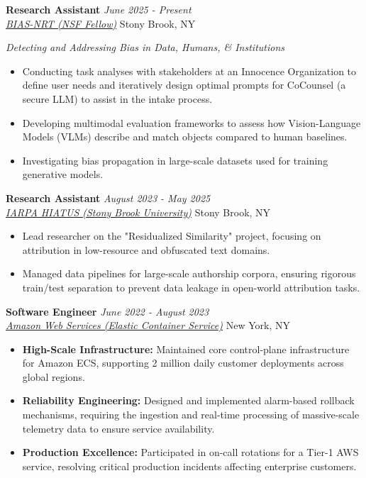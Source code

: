 \documentclass[letterpaper,10pt]{article}
\newcommand{\organization}[4]{
    \vspace{-1.0pt}
    \textbf{#1} \hfill{\emph{#2}} \\
    \emph{#3} \hfill{#4} \\
    \vspace{1.5pt} %
}
\newcommand{\bulletsBegin}{
    \vspace{1pt}
    \begin{minipage}{17.6cm} 
    \begin{itemize}[leftmargin=0.6cm]
    \setlength\itemsep{1pt} %
}
\newcommand{\bulletsEnd}{
    \end{itemize}\vspace{1pt}
    \end{minipage}
}
\begin{document}
    \organization{Research Assistant}{June 2025 - Present}
        {\href{https://www.stonybrook.edu/commcms/bias-nrt/}{BIAS-NRT (NSF Fellow)}}{Stony Brook, NY}
        \emph{Detecting and Addressing Bias in Data, Humans, \& Institutions}
        \bulletsBegin
            \item Conducting task analyses with stakeholders at an Innocence Organization to define user needs and iteratively design optimal prompts for CoCounsel (a secure LLM) to assist in the intake process.
            \item Developing multimodal evaluation frameworks to assess how Vision-Language Models (VLMs) describe and match objects compared to human baselines.
            \item Investigating bias propagation in large-scale datasets used for training generative models.
        \bulletsEnd

    \organization{Research Assistant}{August 2023 - May 2025}
        {\href{https://www.iarpa.gov/research-programs/hiatus}{IARPA HIATUS (Stony Brook University)}}{Stony Brook, NY}
        \bulletsBegin
            \item Lead researcher on the "Residualized Similarity" project, focusing on attribution in low-resource and obfuscated text domains.
            \item Managed data pipelines for large-scale authorship corpora, ensuring rigorous train/test separation to prevent data leakage in open-world attribution tasks.
        \bulletsEnd
        
    \organization{Software Engineer}{June 2022 - August 2023}
        {\href{https://aws.amazon.com/ecs/}{Amazon Web Services (Elastic Container Service)}}{New York, NY}
        \bulletsBegin
            \item \textbf{High-Scale Infrastructure:} Maintained core control-plane infrastructure for Amazon ECS, supporting 2 million daily customer deployments across global regions.
            \item \textbf{Reliability Engineering:} Designed and implemented alarm-based rollback mechanisms, requiring the ingestion and real-time processing of massive-scale telemetry data to ensure service availability.
            \item \textbf{Production Excellence:} Participated in on-call rotations for a Tier-1 AWS service, resolving critical production incidents affecting enterprise customers.
        \bulletsEnd
        
\end{document}
